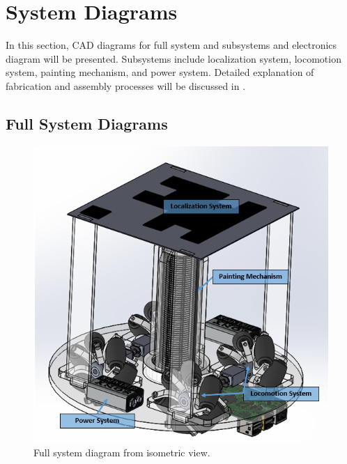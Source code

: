 
\section{System Diagrams}
\label{sec:system_diagrams}

In this section, CAD diagrams for full system and subsystems and electronics diagram will be presented. Subsystems include localization system, locomotion system, painting mechanism, and power system. Detailed explanation of fabrication and assembly processes will be discussed in .

\subsection{Full System Diagrams}
\label{sec:full_sys_diagrams}

\begin{figure}
\centering
\includegraphics[width=0.9\columnwidth]{hardware/CAD/Full System/Full_System.PNG}
\caption{Full system diagram from isometric view.}
\label{fig:full-sys-diagram-iso}
\end{figure}

